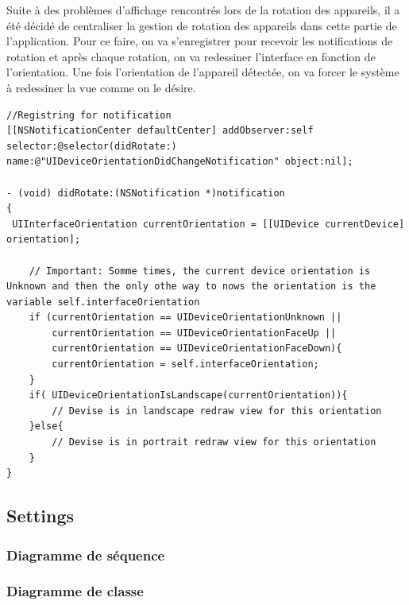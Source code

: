 		Suite à des problèmes d'affichage rencontrés lors de la rotation des appareils, il a été décidé de centraliser la gestion de rotation des appareils dans cette partie de l'application. Pour ce faire, on va s'enregistrer pour recevoir les notifications de rotation et après chaque rotation, on va redessiner l'interface en fonction de l'orientation. Une fois l'orientation de l'appareil détectée, on va forcer le système à redessiner la vue comme on le désire. 
		
			\lstset{
			    style = Xcode,
			    caption=Code d'enregistrement pour la notification de rotation des appareils.,
			    breaklines=true,
			    frame=single
			}
		
			\begin{lstlisting}[name=Orientation did change notification  , label=SampleCode]
		//Registring for notification
[[NSNotificationCenter defaultCenter] addObserver:self selector:@selector(didRotate:) name:@"UIDeviceOrientationDidChangeNotification" object:nil];

- (void) didRotate:(NSNotification *)notification
{	
 UIInterfaceOrientation currentOrientation = [[UIDevice currentDevice] orientation];
    
    // Important: Somme times, the current device orientation is Unknown and then the only othe way to nows the orientation is the variable self.interfaceOrientation
    if (currentOrientation == UIDeviceOrientationUnknown ||
		currentOrientation == UIDeviceOrientationFaceUp ||
		currentOrientation == UIDeviceOrientationFaceDown){
		currentOrientation = self.interfaceOrientation;
    }
    if( UIDeviceOrientationIsLandscape(currentOrientation)){
		// Devise is in landscape redraw view for this orientation
	}else{
		// Devise is in portrait redraw view for this orientation
	}
}
		\end{lstlisting}
	\subsection{Settings}
		\subsubsection*{Diagramme de séquence}
			
		\subsubsection*{Diagramme de classe}
